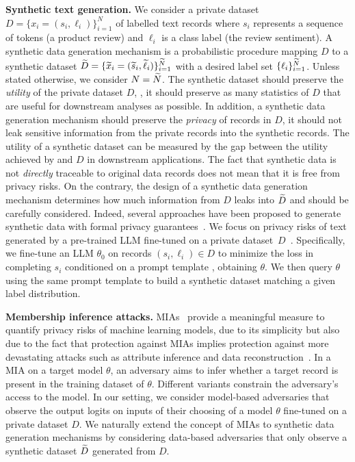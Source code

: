 \textbf{Synthetic text generation.} 
We consider a private dataset $D = \{x_i = (s_i, \ell_i)\}_{i=1}^N$ of labelled text records where $s_i$ represents a sequence of tokens (\eg a product review) and $\ell_i$ is a class label (\eg the review sentiment). 
%
A synthetic data generation mechanism is a probabilistic procedure mapping $D$ to a synthetic dataset ${\widetilde{D}} = \{ {\widetilde{x}}_i = ({\widetilde{s}}_i, {\widetilde{\ell}}_i) \}_{i=1}^{\widetilde{N}}$ with a desired label set $\{\ell_i\}_{i=1}^{\widetilde{N}}$. Unless stated otherwise, we consider $N = {\widetilde{N}}$. The synthetic dataset  should preserve the \emph{utility} of the private dataset $D$, \ie, it should preserve as many statistics of $D$ that are useful for downstream analyses as possible. In addition, a synthetic data generation mechanism should preserve the \emph{privacy} of records in $D$, \ie it should not leak sensitive information from the private records into the synthetic records.
%
The utility of a synthetic dataset can be measured by the gap between the utility achieved by  and $D$ in downstream applications. The fact that synthetic data is not \textit{directly} traceable to original data records does not mean that it is free from privacy risks. On the contrary, the design of a synthetic data generation mechanism determines how much information from $D$ leaks into ${\widetilde{D}}$ and should be carefully considered. Indeed, several approaches have been proposed to generate synthetic data with formal privacy guarantees~\citep{kim2021differentially,tangprivacy,wuprivacy,xiedifferentially}. 
%
We focus on privacy risks of text generated by a pre-trained LLM fine-tuned on a private dataset~$D$~\citep{yue2023synthetic,mattern2022differentially,kurakin2023harnessing}. 
%
Specifically, we fine-tune an LLM $\theta_0$ on records $(s_i, \ell_i) \in D$ to minimize the loss in completing $s_i$ conditioned on a prompt template , obtaining $\theta$.
%
We then query $\theta$ using the same prompt template to build a synthetic dataset  matching a given label distribution.


\textbf{Membership inference attacks.}
MIAs~\citep{shokri2017membership} provide a meaningful measure to quantify privacy risks of machine learning models, due to its simplicity but also due to the fact that protection against MIAs implies protection against more devastating attacks such as attribute inference and data reconstruction~\citep{sok-games:2023}. 
%
In a MIA on a target model $\theta$, an adversary aims to infer whether a target record is present in the training dataset of $\theta$. Different variants constrain the adversary's access to the model. 
%
In our setting, we consider model-based adversaries that observe the output logits on inputs of their choosing of a model $\theta$ fine-tuned on a private dataset $D$.
%
We naturally extend the concept of MIAs to synthetic data generation mechanisms by considering data-based adversaries that only observe a synthetic dataset ${\widetilde{D}}$ generated from $D$.


